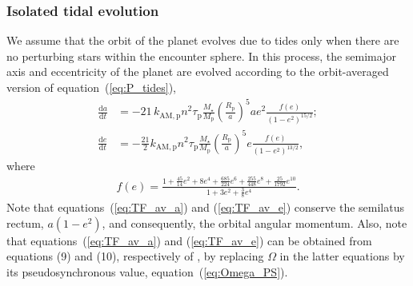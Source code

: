 \documentclass[iop,usenatbib]{emulateapj}
\begin{document}
\subsubsection{Isolated tidal evolution}
\label{sect:pop_syn:enc_gen:tides}
We assume that the orbit of the planet evolves due to tides only when there are no perturbing stars within the encounter sphere. In this process, the semimajor axis and eccentricity of the planet are evolved according to the orbit-averaged version of equation~(\ref{eq:P_tides}),
\begin{subequations}
\label{eq:TF_av}
\begin{align}
\label{eq:TF_av_a}
\frac{\mathrm{d} a}{\mathrm{d} t} &= - 21 \, k_\mathrm{AM,p} n^2 \tau_\mathrm{p} \frac{M_\star}{M_\mathrm{p}} \left ( \frac{R_\mathrm{p}}{a} \right )^5 a e^2 \frac{f(e)}{\left(1-e^2\right)^{15/2}}; \\
\label{eq:TF_av_e}
\frac{\mathrm{d} e}{\mathrm{d} t} &= -\frac{21}{2} k_\mathrm{AM,p} n^2 \tau_\mathrm{p} \frac{M_\star}{M_\mathrm{p}} \left ( \frac{R_\mathrm{p}}{a} \right )^5 e \frac{f(e)}{\left(1-e^2\right)^{13/2}}, 
\end{align}
\end{subequations}
where
\begin{align}
f(e) = \frac{1 + \frac{45}{14} e^2 + 8 e^4 + \frac{685}{224} e^6 + \frac{255}{448} e^8 + \frac{25}{1792} e^{10}}{1 + 3 e^2 + \frac{3}{8} e^4}.
\end{align}
Note that equations~(\ref{eq:TF_av_a}) and (\ref{eq:TF_av_e}) conserve the semilatus rectum, $a\left(1-e^2\right)$, and consequently, the orbital angular momentum. Also, note that equations~(\ref{eq:TF_av_a}) and (\ref{eq:TF_av_e}) can be obtained from equations (9) and (10), respectively of \citet{1981A&A....99..126H}, by replacing $\Omega$ in the latter equations by its pseudosynchronous value, equation~(\ref{eq:Omega_PS}).
\end{document}
